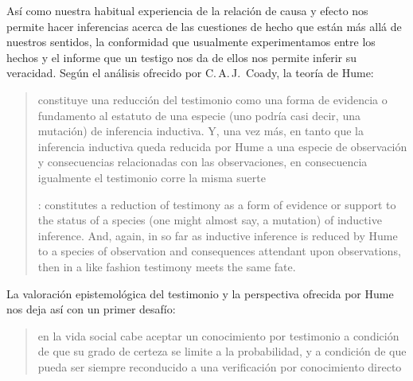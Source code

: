 Así como nuestra habitual experiencia de la relación de causa y efecto nos
permite hacer inferencias acerca de las cuestiones de hecho que están más allá
de nuestros sentidos, la conformidad que usualmente experimentamos entre los
hechos y el informe que un testigo nos da de ellos nos permite inferir su
veracidad. Según el análisis ofrecido por C.\,A.\,J.~Coady, la teoría de Hume:
\blockquote[{\cite[79]{coady1992test}}: constitutes a reduction of testimony as
a form of evidence or support to the status of a species (one might almost say,
a mutation) of inductive inference. And, again, in so far as inductive inference
is reduced by Hume to a species of observation and consequences attendant upon
observations, then in a like fashion testimony meets the same fate.]{constituye
  una reducción del testimonio como una forma de evidencia o fundamento al
  estatuto de una especie (uno podría casi decir, una mutación) de inferencia
  inductiva. Y, una vez más, en tanto que la inferencia inductiva queda reducida
  por Hume a una especie de observación y consecuencias relacionadas con las
  observaciones, en consecuencia igualmente el testimonio corre la misma suerte}
La valoración epistemológica del testimonio y la perspectiva ofrecida por Hume
nos deja así con un primer desafío:
\blockquote[{\cite[294]{prades2015testimonio}}]{en la vida social cabe aceptar
  un conocimiento por testimonio a condición de que su grado de certeza se
  limite a la probabilidad, y a condición de que pueda ser siempre reconducido a
  una verificación por conocimiento directo}.

